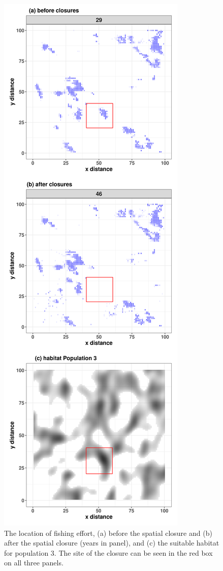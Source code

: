 \documentclass[review]{elsarticle}
\begin{document}
\begin{figure}[!ht]
	\centering
	\includegraphics[width =0.5\linewidth]{./Plots/Closure_fishing_locations_yearly}
	\caption{The location of fishing effort, (a) before the spatial closure
		and (b) after the spatial closure (years in panel), and (c) the
		suitable habitat for population 3. The site of the closure
		can be seen in the red box on all three panels.}
	\label{fig:17}
\end{figure}	
\end{document}
